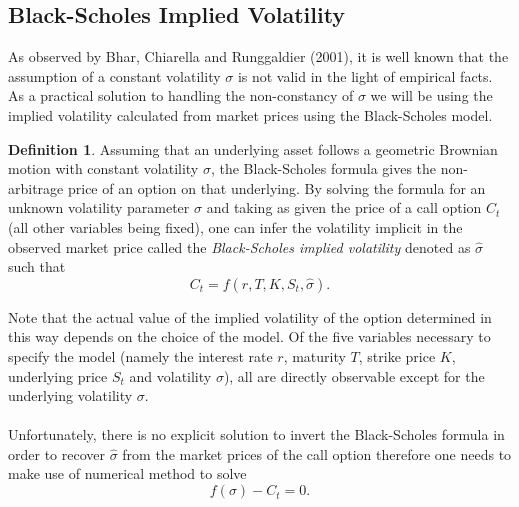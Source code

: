 \documentclass{article}
\theoremstyle{definition}
\newtheorem{definition}[thm]{Definition}
\theoremstyle{remark}
\begin{document}
\subsection{Black-Scholes Implied Volatility}
As observed by Bhar, Chiarella and Runggaldier (2001), it is well known that the assumption of a constant volatility $\sigma$ is not valid in the light of empirical facts. As a practical solution to handling the non-constancy of $\sigma$ we will be using the implied volatility calculated from market prices using the Black-Scholes model.
\begin{definition}
Assuming that an underlying asset follows a geometric Brownian motion with constant volatility $\sigma$, the Black-Scholes formula gives the non-arbitrage price of an option on that underlying. By solving the formula for an unknown volatility parameter $\sigma$ and taking as given the price of a call option $C_t$ (all other variables being fixed), one can infer the volatility implicit in the observed market price called the \textit{Black-Scholes implied volatility} denoted as $\hat{\sigma}$ such that
\begin{equation*}
C_t=f(r, T, K, S_t, \hat{\sigma}).
\end{equation*}
\end{definition}

Note that the actual value of the implied volatility of the option determined in this way depends on the choice of the model. Of the five variables necessary to specify the model (namely the interest rate $r$, maturity $T$, strike price $K$, underlying price $S_t$ and volatility $\sigma$), all are directly observable except for the underlying volatility $\sigma$. \\
\\
Unfortunately, there is no explicit solution to invert the Black-Scholes formula in order to recover $\hat{\sigma}$ from the market prices of the call option therefore one needs to make use of numerical method to solve
$$f(\sigma)-C_t=0.$$
\end{document}
